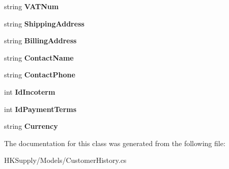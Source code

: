 \begin{DoxyCompactItemize}
string {\bfseries V\+A\+T\+Num}
\item 
\mbox{\label{class_h_k_supply_1_1_models_1_1_customer_history_a3ea941a1239344f09b77ed4bc7ecd972}} 
string {\bfseries Shipping\+Address}
\item 
\mbox{\label{class_h_k_supply_1_1_models_1_1_customer_history_a8c60f8d3185afeb8764d61bde61b89bb}} 
string {\bfseries Billing\+Address}
\item 
\mbox{\label{class_h_k_supply_1_1_models_1_1_customer_history_a66da89d7a3551f633f2e746a7f65191e}} 
string {\bfseries Contact\+Name}
\item 
\mbox{\label{class_h_k_supply_1_1_models_1_1_customer_history_a5f2166fba0c1b036b6575c82f87663f2}} 
string {\bfseries Contact\+Phone}
\item 
\mbox{\label{class_h_k_supply_1_1_models_1_1_customer_history_ad433272caf547b443cf40c597e8cb15f}} 
int {\bfseries Id\+Incoterm}
\item 
\mbox{\label{class_h_k_supply_1_1_models_1_1_customer_history_a01b1ba2b3b0301c42bd12591ebc17646}} 
int {\bfseries Id\+Payment\+Terms}
\item 
\mbox{\label{class_h_k_supply_1_1_models_1_1_customer_history_af03e1c8bfde2907a2fe4ee4d03394fe5}} 
string {\bfseries Currency}
\end{DoxyCompactItemize}


The documentation for this class was generated from the following file\+:\begin{DoxyCompactItemize}
\item 
H\+K\+Supply/\+Models/Customer\+History.\+cs\end{DoxyCompactItemize}
